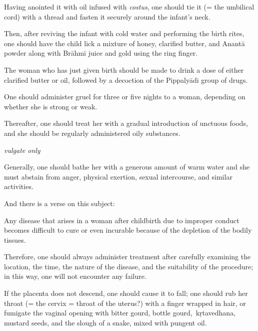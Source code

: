 \begin{translation}
\begin{tt}
Having anointed it with oil infused with \emph{costus}, one should tie
it (= the umbilical cord) with a thread and fasten it securely around
the infant's neck.

\item[13]

Then, after reviving the infant with cold water and performing the birth
rites, one should have the child lick a mixture of honey, clarified
butter, and Anantā powder along with Brāhmī juice and gold using the
ring finger.

The woman who has just given birth should be made to drink a dose of
either clarified butter or oil, followed by a decoction of the
Pippalyādi group of drugs.

One should administer gruel for three or five nights to a woman,
depending on whether she is strong or weak.

Thereafter, one should treat her with a gradual introduction of unctuous
foods, and she should be regularly administered oily substances.

\item[14--17] \emph{vulgate only}

\item[18]

Generally, one should bathe her with a generous amount of warm water and
she must abstain from anger, physical exertion, sexual intercourse, and
similar activities.

\item[19]

And there is a verse on this subject:

\begin{sloka}
    Any disease that arises in a woman after childbirth due to improper
conduct becomes difficult to cure or even incurable because of the
depletion of the bodily tissues.
\end{sloka}

\item[20]

Therefore, one should always administer treatment after carefully
examining the location, the time, the nature of the disease, and the
suitability of the procedure; in this way, one will not encounter any
failure.

\item[21]

If the placenta does not descend, one should cause it to fall; one
should rub her throat (= the cervix = throat of the uterus?) with a
finger wrapped in hair, or fumigate the vaginal opening with bitter
gourd, bottle gourd,~\gls{kṛtavedhana}, mustard seeds, and the slough
of a snake, mixed with pungent oil.


\end{tt}
\end{translation}
